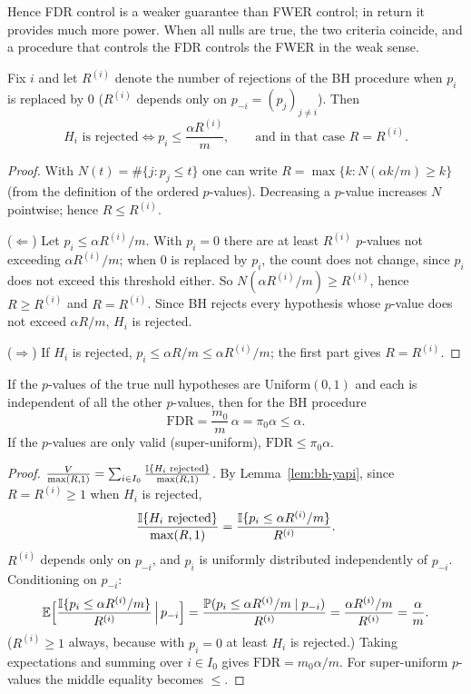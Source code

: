 \documentclass[main.tex]{subfiles}
\begin{document}
Hence FDR control is a weaker guarantee than FWER control; in return it provides much more power. When all nulls are true, the two criteria coincide, and a procedure that controls the FDR controls the FWER in the weak sense.

\begin{lemma}[Structure of BH]\label{lem:bh-yapi}
Fix $i$ and let $R^{(i)}$ denote the number of rejections of the BH procedure when $p_i$ is replaced by $0$ ($R^{(i)}$ depends only on $p_{-i}=(p_j)_{j\ne i}$). Then
\[
H_i\text{ is rejected}\iff p_i\le\frac{\alpha R^{(i)}}m,\qquad\text{and in that case }R=R^{(i)}.
\]
\end{lemma}
\begin{proof}
With $N(t)=\#\{j:p_j\le t\}$ one can write $R=\max\{k:N(\alpha k/m)\ge k\}$ (from the definition of the ordered $p$-values). Decreasing a $p$-value increases $N$ pointwise; hence $R\le R^{(i)}$.

($\Leftarrow$) Let $p_i\le\alpha R^{(i)}/m$. With $p_i=0$ there are at least $R^{(i)}$ $p$-values not exceeding $\alpha R^{(i)}/m$; when $0$ is replaced by $p_i$, the count does not change, since $p_i$ does not exceed this threshold either. So $N(\alpha R^{(i)}/m)\ge R^{(i)}$, hence $R\ge R^{(i)}$ and $R=R^{(i)}$. Since BH rejects every hypothesis whose $p$-value does not exceed $\alpha R/m$, $H_i$ is rejected.

($\Rightarrow$) If $H_i$ is rejected, $p_i\le\alpha R/m\le\alpha R^{(i)}/m$; the first part gives $R=R^{(i)}$.
\end{proof}

\begin{theorem}\label{thm:bh}
If the $p$-values of the true null hypotheses are $\text{Uniform}(0,1)$ and each is independent of all the other $p$-values, then for the BH procedure
\[
\mathrm{FDR}=\frac{m_0}m\,\alpha=\pi_0\alpha\le\alpha .
\]
If the $p$-values are only valid (super-uniform), $\mathrm{FDR}\le\pi_0\alpha$.
\end{theorem}
\begin{proof}
$\frac{V}{\max(R,1)}=\sum_{i\in I_0}\frac{\mathbb{I}\{H_i\text{ rejected}\}}{\max(R,1)}$. By Lemma~\ref{lem:bh-yapi}, since $R=R^{(i)}\ge1$ when $H_i$ is rejected,
\[
\frac{\mathbb{I}\{H_i\text{ rejected}\}}{\max(R,1)}=\frac{\mathbb{I}\{p_i\le\alpha R^{(i)}/m\}}{R^{(i)}} .
\]
$R^{(i)}$ depends only on $p_{-i}$, and $p_i$ is uniformly distributed independently of $p_{-i}$. Conditioning on $p_{-i}$:
\[
\mathbb{E}\Big[\frac{\mathbb{I}\{p_i\le\alpha R^{(i)}/m\}}{R^{(i)}}\,\Big|\,p_{-i}\Big]=\frac{\mathbb{P}(p_i\le\alpha R^{(i)}/m\mid p_{-i})}{R^{(i)}}=\frac{\alpha R^{(i)}/m}{R^{(i)}}=\frac\alpha m .
\]
($R^{(i)}\ge1$ always, because with $p_i=0$ at least $H_i$ is rejected.) Taking expectations and summing over $i\in I_0$ gives $\mathrm{FDR}=m_0\alpha/m$. For super-uniform $p$-values the middle equality becomes $\le$.
\end{proof}
\end{document}
